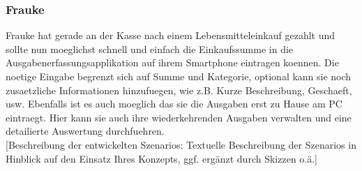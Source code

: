 \subsubsection{Frauke}

Frauke hat gerade an der Kasse nach einem Lebensmitteleinkauf gezahlt und
sollte nun moeglichst schnell und einfach die Einkaufssumme in die
Ausgabenerfassungsapplikation auf ihrem Smartphone eintragen koennen. Die 
noetige Eingabe begrenzt sich auf Summe und Kategorie, optional kann sie noch 
zusaetzliche Informationen hinzufuegen, wie z.B. Kurze Beschreibung, Geschaeft, 
usw. Ebenfalls ist es auch moeglich das sie die Ausgaben erst zu Hause am PC 
eintraegt. Hier kann sie auch ihre wiederkehrenden Ausgaben verwalten und eine 
detailierte Auswertung durchfuehren.\\

[Beschreibung der entwickelten Szenarios: Textuelle Beschreibung der Szenarios in Hinblick auf den Einsatz Ihres Konzepts, ggf. ergänzt durch Skizzen o.ä.]
